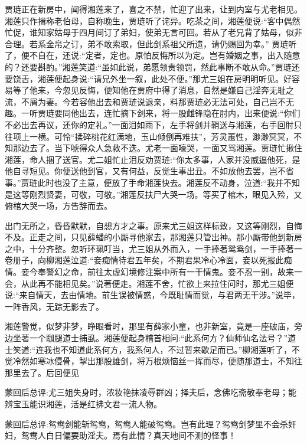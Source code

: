 \begin{parag}
    贾琏正在新房中，闻得湘莲来了，喜之不禁，忙迎了出来，让到内室与尤老相见。湘莲只作揖称老伯母，自称晚生，贾琏听了诧异。吃茶之间，湘莲便说:“客中偶然忙促，谁知家姑母于四月间订了弟妇，使弟无言可回。若从了老兄背了姑母，似非合理。若系金帛之订，弟不敢索取，但此剑系祖父所遗，请仍赐回为幸。” 贾琏听了，便不自在，还说:“定者，定也。原怕反悔所以为定。岂有婚姻之事，出入随意的？还要斟酌。”湘莲笑道:“虽如此说，弟愿领责领罚，然此事断不敢从命。”贾琏还要饶舌，湘莲便起身说:“请兄外坐一叙，此处不便。”那尤三姐在房明明听见。好容易等了他来，今忽见反悔，便知他在贾府中得了消息，自然是嫌自己淫奔无耻之流，不屑为妻。今若容他出去和贾琏说退亲，料那贾琏必无法可处，自己岂不无趣。一听贾琏要同他出去，连忙摘下剑来，将一股雌锋隐在肘内，出来便说:“你们不必出去再议，还你的定礼。”一面泪如雨下，左手将剑并鞘送与湘莲，右手回肘只往项上一横。可怜“揉碎桃花红满地，玉山倾倒再难扶”，芳灵蕙性，渺渺冥冥，不知那边去了。当下唬得众人急救不迭。尤老一面嚎哭，一面又骂湘莲。贾琏忙揪住湘莲，命人捆了送官。尤二姐忙止泪反劝贾琏:“你太多事，人家并没威逼他死，是他自寻短见。你便送他到官，又有何益，反觉生事出丑。不如放他去罢，岂不省事。”贾琏此时也没了主意，便放了手命湘莲快去。湘莲反不动身，泣道:“我并不知是这等刚烈贤妻，可敬，可敬。”湘莲反扶尸大哭一场。等买了棺木，眼见入殓，又俯棺大哭一场，方告辞而去。
\end{parag}


\begin{parag}
    出门无所之，昏昏默默，自想方才之事。原来尤三姐这样标致，又这等刚烈，自悔不及。正走之间，只见薛蟠的小厮寻他家去，那湘莲只管出神。那小厮带他到新房之中，十分齐整。忽听环珮叮当，尤三姐从外而入，一手捧著鸳鸯剑，一手捧著一卷册子，向柳湘莲泣道:“妾痴情待君五年矣，不期君果冷心冷面，妾以死报此痴情。妾今奉警幻之命，前往太虚幻境修注案中所有一干情鬼。妾不忍一别，故来一会，从此再不能相见矣。”说著便走。湘莲不舍，忙欲上来拉住问时，那尤三姐便说:“来自情天，去由情地。前生误被情惑，今既耻情而觉，与君两无干涉。”说毕，一阵香风，无踪无影去了。
\end{parag}


\begin{parag}
    湘莲警觉，似梦非梦，睁眼看时，那里有薛家小童，也非新室，竟是一座破庙，旁边坐著一个跏腿道士捕虱。湘莲便起身稽首相问:“此系何方？仙师仙名法号？”道士笑道:“连我也不知道此系何方，我系何人，不过暂来歇足而已。”柳湘莲听了，不觉冷然如寒冰侵骨，掣出那股雄剑，将万根烦恼丝一挥而尽，便随那道士，不知往那里去了。后回便见
\end{parag}


\begin{parag}
    \begin{note}蒙回后总评:尤三姐失身时，浓妆艳抹凌辱群凶；择夫后，念佛吃斋敬奉老母；能辨宝玉能识湘莲，活是红拂文君一流人物。\end{note}
\end{parag}


\begin{parag}
    \begin{note}蒙回后总评:鸳鸯剑能斩鸳鸯，鸳鸯人能破鸳鸯。岂有此理？鸳鸯剑梦里不会杀奸妇，鸳鸯人白日偏要助淫夫。焉有此情？真天地间不测的怪事！\end{note}
\end{parag}
